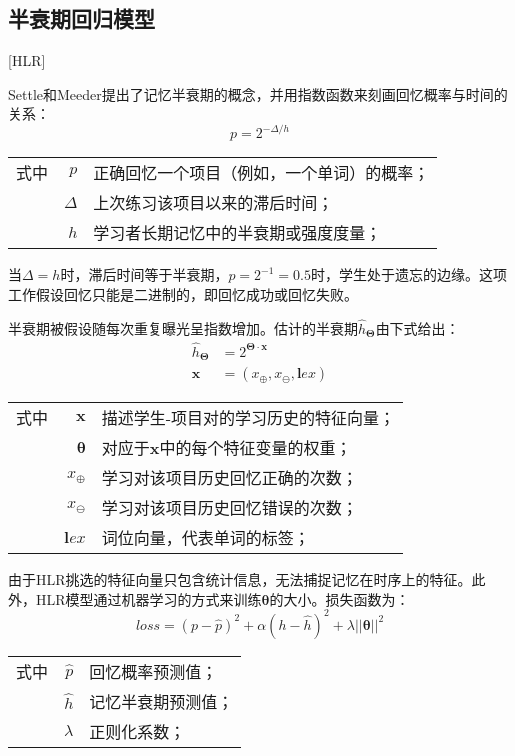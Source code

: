 \subsection{半衰期回归模型}[HLR]\label{sec:HLR}

Settle和Meeder\cite{settlesTrainableSpacedRepetition2016}提出了记忆半衰期的概念，并用指数函数来刻画回忆概率与时间的关系：
\begin{equation}
p = 2^{-\Delta/h}
\end{equation}
\begin{tabularx}{\textwidth}{@{}l@{\quad}r@{———}X@{}}
    式中& $p$ &正确回忆一个项目（例如，一个单词）的概率；\\
    & $\Delta$ &上次练习该项目以来的滞后时间；\\
    & $h$ &学习者长期记忆中的半衰期或强度度量；
\end{tabularx}\vspace{3.15bp}

当$\Delta=h$时，滞后时间等于半衰期，$p=2^{-1}=0.5$时，学生处于遗忘的边缘。这项工作假设回忆只能是二进制的，即回忆成功或回忆失败。

半衰期被假设随每次重复曝光呈指数增加。估计的半衰期$\hat{h}_{\bm\Theta}$由下式给出：
\begin{equation}
\begin{aligned}
\hat{h}_{\bm\Theta}&=2^{\bm\Theta \cdot \bm x}\\
\bm x &= (x_\mathrm{\oplus},x_\mathrm{\ominus}, \bm lex)
\end{aligned}
\end{equation}
\begin{tabularx}{\textwidth}{@{}l@{\quad}r@{———}X@{}}
    式中& $\bm x$ &描述学生-项目对的学习历史的特征向量；\\
    & $\bm \theta$ &对应于$\bm x$中的每个特征变量的权重；\\
    & $x_\mathrm{\oplus}$ &学习对该项目历史回忆正确的次数；\\
    & $x_\mathrm{\ominus}$ &学习对该项目历史回忆错误的次数；\\
    & $\bm lex$ &词位向量，代表单词的标签；
\end{tabularx}\vspace{3.15bp}

由于HLR挑选的特征向量只包含统计信息，无法捕捉记忆在时序上的特征。此外，HLR模型通过机器学习的方式来训练$\bm \theta$的大小。损失函数为：
\begin{equation}
\label{eqn:hlr:loss}
loss=(p-\hat p)^2 + \alpha(h-\hat h)^2 + \lambda||\bm\theta||^2
\end{equation}
\begin{tabularx}{\textwidth}{@{}l@{\quad}r@{———}X@{}}
    式中& $\hat p$ &回忆概率预测值；\\
    & $\hat h$ &记忆半衰期预测值；\\
    & $\lambda$ &正则化系数；
\end{tabularx}\vspace{3.15bp}

